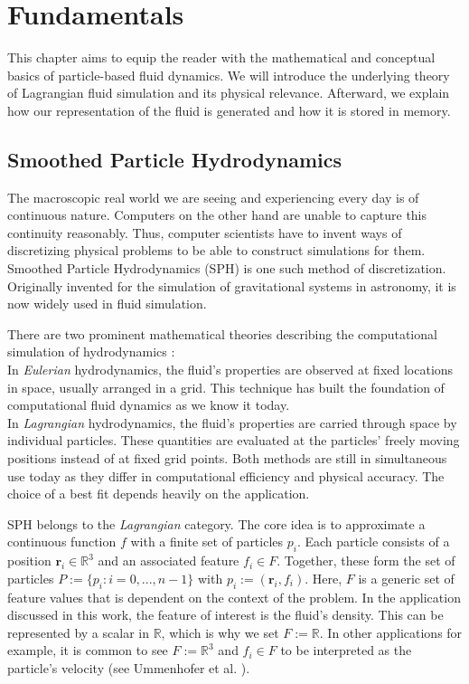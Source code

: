%
\chapter{Fundamentals}
\label{sec:fundamentals}

This chapter aims to equip the reader with the mathematical and conceptual basics of particle-based fluid dynamics. We will introduce the underlying theory of Lagrangian fluid simulation and its physical relevance. Afterward, we explain how our representation of the fluid is generated and how it is stored in memory.

\section{Smoothed Particle Hydrodynamics}
\label{sec:sph}

The macroscopic real world we are seeing and experiencing every day is of continuous nature. Computers on the other hand are unable to capture this continuity reasonably. Thus, computer scientists have to invent ways of discretizing physical problems to be able to construct simulations for them. Smoothed Particle Hydrodynamics (SPH) is one such method of discretization. Originally invented for the simulation of gravitational systems in astronomy, it is now widely used in fluid simulation.

There are two prominent mathematical theories describing the computational simulation of hydrodynamics \cite{Monaghan:2005}: \\
In \textit{Eulerian} hydrodynamics, the fluid's properties are observed at fixed locations in space, usually arranged in a grid. This technique has built the foundation of computational fluid dynamics as we know it today. \\
In \textit{Lagrangian} hydrodynamics, the fluid's properties are carried through space by individual particles. These quantities are evaluated at the particles' freely moving positions instead of at fixed grid points.
Both methods are still in simultaneous use today as they differ in computational efficiency and physical accuracy. The choice of a best fit depends heavily on the application.

SPH belongs to the \textit{Lagrangian} category. The core idea is to approximate a continuous function $f$ with a finite set of particles $p_i$. Each particle consists of a position $\textbf{r}_i \in \mathbb{R}^3$ and an associated feature $f_i \in F$. Together, these form the set of particles $P := \{ p_i: i = 0,...,n-1 \}$ with $p_i := (\textbf{r}_i, f_i)$. Here, $F$ is a generic set of feature values that is dependent on the context of the problem. In the application discussed in this work, the feature of interest is the fluid's density. This can be represented by a scalar in $\mathbb{R}$, which is why we set $F := \mathbb{R}$. In other applications for example, it is common to see $F := \mathbb{R}^3$ and $f_i \in F$ to be interpreted as the particle's velocity (see Ummenhofer et al. \cite{Ummenhofer:2020}).

